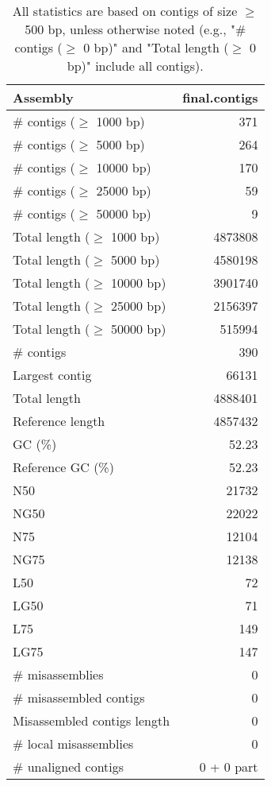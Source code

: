 \documentclass[12pt,a4paper]{article}
\begin{document}
\begin{table}[ht]
\begin{center}
\caption{All statistics are based on contigs of size $\geq$ 500 bp, unless otherwise noted (e.g., "\# contigs ($\geq$ 0 bp)" and "Total length ($\geq$ 0 bp)" include all contigs).}
\begin{tabular}{|l*{1}{|r}|}
\hline
Assembly & final.contigs \\ \hline
\# contigs ($\geq$ 1000 bp) & 371 \\ \hline
\# contigs ($\geq$ 5000 bp) & 264 \\ \hline
\# contigs ($\geq$ 10000 bp) & 170 \\ \hline
\# contigs ($\geq$ 25000 bp) & 59 \\ \hline
\# contigs ($\geq$ 50000 bp) & 9 \\ \hline
Total length ($\geq$ 1000 bp) & 4873808 \\ \hline
Total length ($\geq$ 5000 bp) & 4580198 \\ \hline
Total length ($\geq$ 10000 bp) & 3901740 \\ \hline
Total length ($\geq$ 25000 bp) & 2156397 \\ \hline
Total length ($\geq$ 50000 bp) & 515994 \\ \hline
\# contigs & 390 \\ \hline
Largest contig & 66131 \\ \hline
Total length & 4888401 \\ \hline
Reference length & 4857432 \\ \hline
GC (\%) & 52.23 \\ \hline
Reference GC (\%) & 52.23 \\ \hline
N50 & 21732 \\ \hline
NG50 & 22022 \\ \hline
N75 & 12104 \\ \hline
NG75 & 12138 \\ \hline
L50 & 72 \\ \hline
LG50 & 71 \\ \hline
L75 & 149 \\ \hline
LG75 & 147 \\ \hline
\# misassemblies & 0 \\ \hline
\# misassembled contigs & 0 \\ \hline
Misassembled contigs length & 0 \\ \hline
\# local misassemblies & 0 \\ \hline
\# unaligned contigs & 0 + 0 part \\ \hline

\end{tabular}
\end{center}
\end{table}
\end{document}

